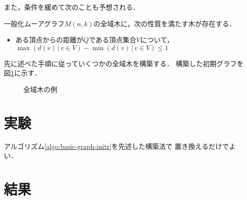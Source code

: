 また，条件を緩めて次のことも予想される．
\begin{conjecture}
  \label{conj:spanning-tree-2}
  一般化ムーアグラフ$M(n,k)$の全域木に，次の性質を満たす木が存在する．
  \begin{itemize}
  \item ある頂点からの距離が$Q$である頂点集合$V$について，
    $\max(d(v)\,|\,v\in V)-\min(d(v)\,|\,v\in V)\leq 1$
  \end{itemize}
\end{conjecture}

\begin{example}
  先に述べた手順に従っていくつかの全域木を構築する．
  構築した初期グラフを図\ref{fig:initial-spanning-tree-example}に示す．
  \begin{figure}
    \centering
    \hfill
    \caption{全域木の例}
    \label{fig:initial-spanning-tree-example}
  \end{figure}
\end{example}

\section{実験}
\label{sect:exp-reduce-by-initial}
アルゴリズム\ref{algo:basic-graph-initr}を先述した構築法で
置き換えるだけでよい．

\section{結果}
\label{sect:result-reduce-by-initial}
